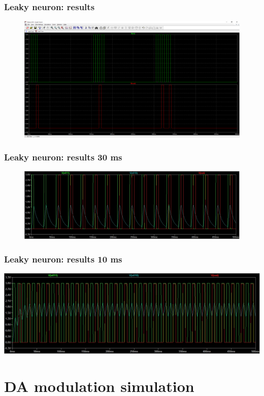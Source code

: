 \documentclass[12pt, aspectratio=169]{beamer}
\begin{document}

\begin{frame}
\frametitle{Leaky neuron: results}
\begin{figure}
\includegraphics[width=0.85\linewidth]{Leak_test}
\end{figure}
\end{frame}

\begin{frame}
\frametitle{Leaky neuron: results 30 ms}
\begin{figure}
\includegraphics[width=0.85\linewidth]{30}
\end{figure}
\end{frame}


\begin{frame}
\frametitle{Leaky neuron: results 10 ms}
\centering
\includegraphics[width=0.85\linewidth]{10}
\end{frame}

\section{DA modulation simulation}
\end{document}
